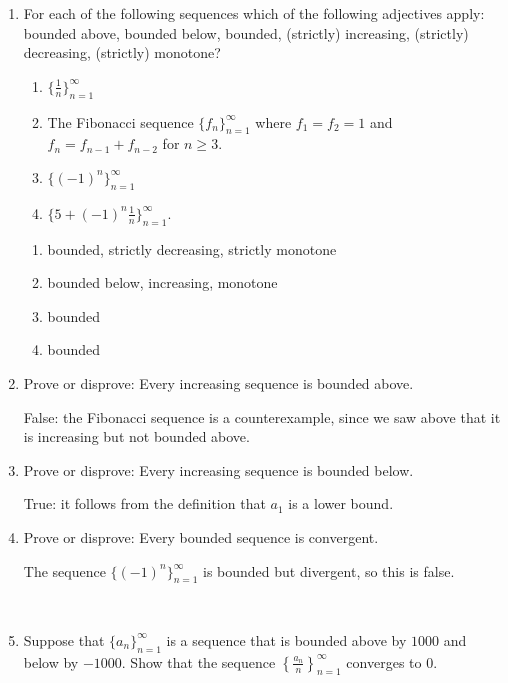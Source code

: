 \documentclass[12pt]{amsart}
\numberwithin{equation}{section}
\theoremstyle{plain} %
\theoremstyle{definition}
\theoremstyle{remark}
\begin{document}
\begin{enumerate}

\item For each of the following sequences which of the following adjectives apply: bounded above, bounded below, bounded, (strictly) increasing, (strictly) decreasing, (strictly) monotone?
\begin{enumerate}
\item $\{ \frac{1}{n} \}_{n=1}^\infty$
\item The Fibonacci sequence $\{ f_n \}_{n=1}^\infty$ where $f_1=f_2=1$ and $f_n= f_{n-1} + f_{n-2}$ for $n\geq 3$.
\item $\{(-1)^n \}_{n=1}^\infty$
\item $\{ 5 + (-1)^n \frac{1}{n}  \}_{n=1}^\infty$.
\end{enumerate}

\begin{framed}
\begin{enumerate}
\item bounded, strictly decreasing, strictly monotone
\item bounded below, increasing, monotone
\item bounded
\item bounded
\end{enumerate}
\end{framed}


\item Prove or disprove: Every increasing sequence is bounded above.

\begin{framed}
False: the Fibonacci sequence is a counterexample, since we saw above that it is increasing but not bounded above.
\end{framed}

\item Prove or disprove: Every increasing sequence is bounded below.


\begin{framed}
True: it follows from the definition that $a_1$ is a lower bound.
\end{framed}

\item Prove or disprove: Every bounded sequence is convergent.
\begin{framed}
The sequence $\{(-1)^n\}_{n=1}^\infty$ is bounded but divergent, so this is false.
\end{framed}

\

\item Suppose that $\{a_n\}_{n=1}^\infty$ is a sequence that is bounded above by $1000$ and below by $-1000$. Show that the sequence $\displaystyle \left\{\frac{a_n}{n}\right\}_{n=1}^\infty$ converges to $0$.


\end{enumerate}
\end{document}
